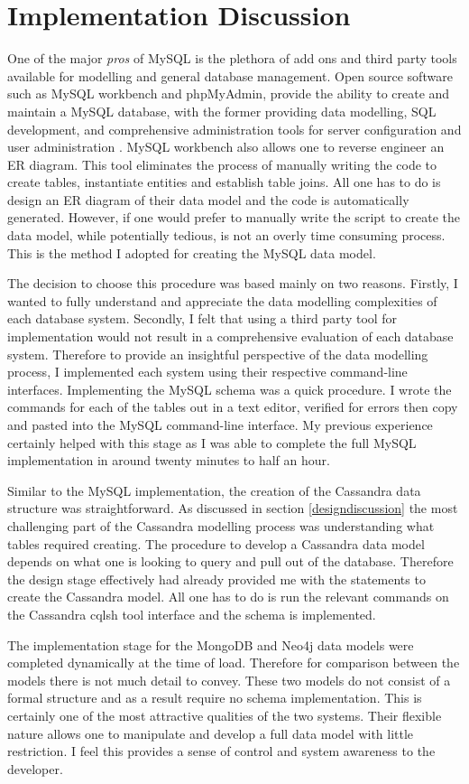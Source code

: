 \section{Implementation Discussion}\label{schemadiscussion}
One of the major \textit{pros} of MySQL is the plethora of add ons and third party tools available for modelling and general database management. Open source software such as MySQL workbench and phpMyAdmin, provide the ability to create and maintain a MySQL database, with the former providing data modelling, SQL development, and comprehensive administration tools for server configuration and user administration \cite{mysqlworkbench}. MySQL workbench also allows one to reverse engineer an ER diagram. This tool eliminates the process of manually writing the code to create tables, instantiate entities and establish table joins. All one has to do is design an ER diagram of their data model and the code is automatically generated. However, if one would prefer to manually write the script to create the data model, while potentially tedious, is not an overly time consuming process. This is the method I adopted for creating the MySQL data model.

The decision to choose this procedure was based mainly on two reasons. Firstly, I wanted to fully understand and appreciate the data modelling complexities of each database system. Secondly, I felt that using a third party tool for implementation would not result in a comprehensive evaluation of each database system. Therefore to provide an insightful perspective of the data modelling process, I implemented each system using their respective command-line interfaces. Implementing the MySQL schema was a quick procedure. I wrote the commands for each of the tables out in a text editor, verified for errors then copy and pasted into the MySQL command-line interface. My previous experience certainly helped with this stage as I was able to complete the full MySQL implementation in around twenty minutes to half an hour. 

Similar to the MySQL implementation, the creation of the Cassandra data structure was straightforward. As discussed in section \ref{designdiscussion} the most challenging part of the Cassandra modelling process was understanding what tables required creating. The procedure to develop a Cassandra data model depends on what one is looking to query and pull out of the database. Therefore the design stage effectively had already provided me with the statements to create the Cassandra model. All one has to do is run the relevant commands on the Cassandra cqlsh tool interface and the schema is implemented.

The implementation stage for the MongoDB and Neo4j data models were completed dynamically at the time of load. Therefore for comparison between the models there is not much detail to convey. These two models do not consist of a formal structure and as a result require no schema implementation. This is certainly one of the most attractive qualities of the two systems. Their flexible nature allows one to manipulate and develop a full data model with little restriction. I feel this provides a sense of control and system awareness to the developer.


